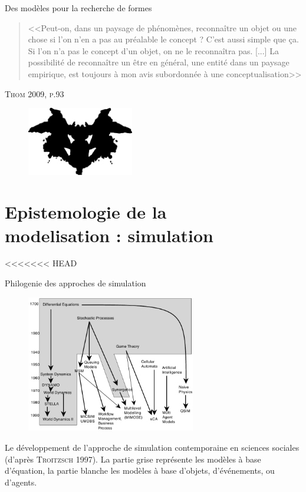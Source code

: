 \documentclass[newPxFont]{beamer}
\begin{document}
\begin{frame}[c]{Des modèles pour la recherche de formes}
  \vspace{-1em}
  \begin{quote}
    <<Peut-on, dans un paysage de phénomènes, reconnaître un objet ou une chose si l'on n'en a pas au préalable le concept ? C'est aussi simple que ça. Si l'on n'a pas le concept d'un objet, on ne le reconnaîtra pas. [...] La possibilité de reconnaître un être en général, une entité dans un paysage empirique, est toujours à mon avis subordonnée à une conceptualisation>>
  \end{quote}
  \hspace*{\fill}\textsc{Thom 2009, p.93}
  \vspace{-0.5em}
  \begin{figure}
   \includegraphics[height=3cm]{img/a_rorschach.png}
  \end{figure}
\end{frame}

\section{Epistemologie de la\\ modelisation : simulation}

<<<<<<< HEAD

\begin{frame}[c]{Philogenie des approches de simulation}
  \vspace{-2em}
  \begin{figure}
   \includegraphics[height=6cm]{img/a_troitzsch_1997.png}
  \end{figure}
  \vspace{-0.8em}
  \small{Le développement de l'approche de simulation contemporaine en sciences sociales (d'après \textsc{Troitzsch} 1997). La partie grise représente les modèles à base d'équation, la partie blanche les modèles à base d'objets, d'événements, ou d'agents}.
\end{frame}
\end{document}
